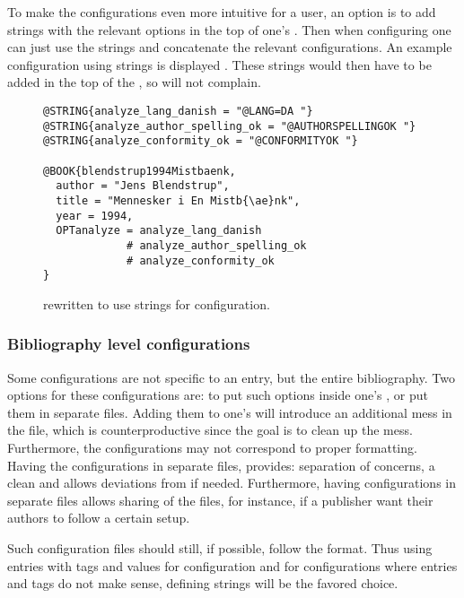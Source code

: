 To make the configurations even more intuitive for a {\bibtex} user,
an option is to add {\bibtex} strings with the relevant options in the
top of one's .  Then when configuring one can just use the
{\bibtex} strings and concatenate the relevant configurations.  An
example configuration using strings is displayed
.  These
strings would then have to be added in the top of the , so
{\bibtex} will not complain.

\begin{figure}
  \centering
\begin{verbatim}
@STRING{analyze_lang_danish = "@LANG=DA "}
@STRING{analyze_author_spelling_ok = "@AUTHORSPELLINGOK "}
@STRING{analyze_conformity_ok = "@CONFORMITYOK "}

@BOOK{blendstrup1994Mistbaenk,
  author = "Jens Blendstrup",
  title = "Mennesker i En Mistb{\ae}nk",
  year = 1994,
  OPTanalyze = analyze_lang_danish
             # analyze_author_spelling_ok
             # analyze_conformity_ok
}
\end{verbatim}
  \caption{
    rewritten to use strings for configuration.}
  \label{fig:analyzing_added_de_facto_standards_strings}
\end{figure}


\subsubsection{Bibliography level configurations}

Some configurations are not specific to an entry, but the entire
bibliography.  Two options for these configurations are: to put such
options inside one's , or put them in separate files.
Adding them to one's  will introduce an additional mess in
the file, which is counterproductive since the goal is to clean up the
mess.  Furthermore, the configurations may not correspond to proper
{\bibtex} formatting.  Having the configurations in separate files,
provides: separation of concerns, a clean  and allows
deviations from {\bibtex} if needed.  Furthermore, having
configurations in separate files allows sharing of the files, for
instance, if a publisher want their authors to follow a certain setup.

Such configuration files should still, if possible, follow the
{\bibtex} format.  Thus using entries with tags and values for
configuration and for configurations where entries and tags do not
make sense, defining {\bibtex} strings will be the favored choice.


